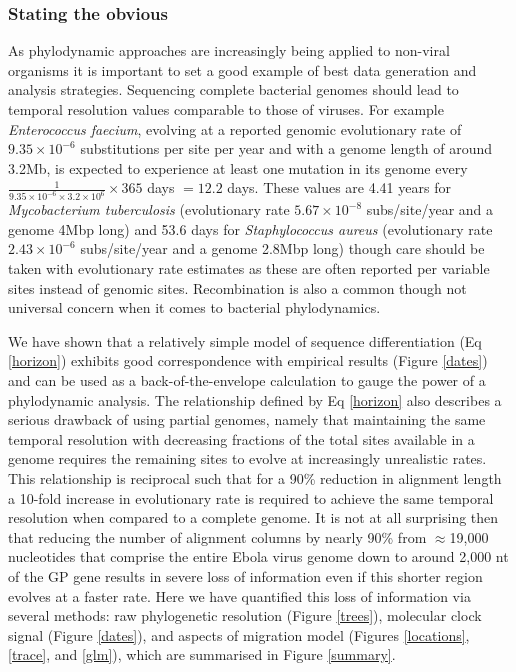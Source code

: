 \documentclass{bmcart}
\begin{document}
\subsubsection*{Stating the obvious}
As phylodynamic approaches are increasingly being applied to non-viral organisms it is important to set a good example of best data generation and analysis strategies.
Sequencing complete bacterial genomes should lead to temporal resolution values comparable to those of viruses.
For example \textit{Enterococcus faecium}, evolving at a reported genomic evolutionary rate of $9.35 \times 10^{-6}$ substitutions per site per year \cite{duchene_genome-scale_2016} and with a genome length of around 3.2Mb, is expected to experience at least one mutation in its genome every $\frac{1}{9.35 \times 10^{-6} \times 3.2 \times 10^{6}} \times 365$ days $= 12.2$ days.
These values are 4.41 years for \textit{Mycobacterium tuberculosis} (evolutionary rate $5.67 \times 10^{-8}$ subs/site/year \cite{duchene_genome-scale_2016} and a genome 4Mbp long) and 53.6 days for \textit{Staphylococcus aureus} (evolutionary rate $2.43 \times 10^{-6}$ subs/site/year \cite{duchene_genome-scale_2016} and a genome 2.8Mbp long) though care should be taken with evolutionary rate estimates as these are often reported per variable sites instead of genomic sites.
Recombination is also a common though not universal concern when it comes to bacterial phylodynamics.

We have shown that a relatively simple model of sequence differentiation (Eq \ref{horizon}) exhibits good correspondence with empirical results (Figure \ref{dates}) and can be used as a back-of-the-envelope calculation to gauge the power of a phylodynamic analysis.
The relationship defined by Eq \ref{horizon} also describes a serious drawback of using partial genomes, namely that maintaining the same temporal resolution with decreasing fractions of the total sites available in a genome requires the remaining sites to evolve at increasingly unrealistic rates.
This relationship is reciprocal such that for a 90\% reduction in alignment length a 10-fold increase in evolutionary rate is required to achieve the same temporal resolution when compared to a complete genome.
It is not at all surprising then that reducing the number of alignment columns by nearly 90\% from $\approx$19,000 nucleotides that comprise the entire Ebola virus genome down to around 2,000 nt of the GP gene results in severe loss of information even if this shorter region evolves at a faster rate.
Here we have quantified this loss of information via several methods: raw phylogenetic resolution (Figure \ref{trees}), molecular clock signal (Figure \ref{dates}), and aspects of migration model (Figures \ref{locations}, \ref{trace}, and \ref{glm}), which are summarised in Figure \ref{summary}.
\end{document}
